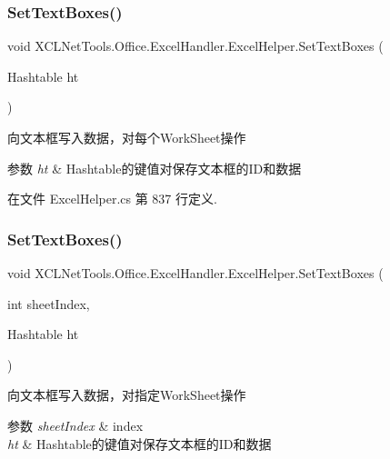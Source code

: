 \subsubsection{\texorpdfstring{Set\+Text\+Boxes()}{SetTextBoxes()}\hspace{0.1cm}{\footnotesize\ttfamily [1/2]}}
{\footnotesize\ttfamily void X\+C\+L\+Net\+Tools.\+Office.\+Excel\+Handler.\+Excel\+Helper.\+Set\+Text\+Boxes (\begin{DoxyParamCaption}\item[{Hashtable}]{ht }\end{DoxyParamCaption})}



向文本框写入数据，对每个\+Work\+Sheet操作 


\begin{DoxyParams}{参数}
{\em ht} & Hashtable的键值对保存文本框的\+I\+D和数据\\
\hline
\end{DoxyParams}


在文件 Excel\+Helper.\+cs 第 837 行定义.

\mbox{\label{class_x_c_l_net_tools_1_1_office_1_1_excel_handler_1_1_excel_helper_afcac92ace2a349e193920ad28101dd0e}} 
\subsubsection{\texorpdfstring{Set\+Text\+Boxes()}{SetTextBoxes()}\hspace{0.1cm}{\footnotesize\ttfamily [2/2]}}
{\footnotesize\ttfamily void X\+C\+L\+Net\+Tools.\+Office.\+Excel\+Handler.\+Excel\+Helper.\+Set\+Text\+Boxes (\begin{DoxyParamCaption}\item[{int}]{sheet\+Index,  }\item[{Hashtable}]{ht }\end{DoxyParamCaption})}



向文本框写入数据，对指定\+Work\+Sheet操作 


\begin{DoxyParams}{参数}
{\em sheet\+Index} & index\\
\hline
{\em ht} & Hashtable的键值对保存文本框的\+I\+D和数据\\
\hline
\end{DoxyParams}


